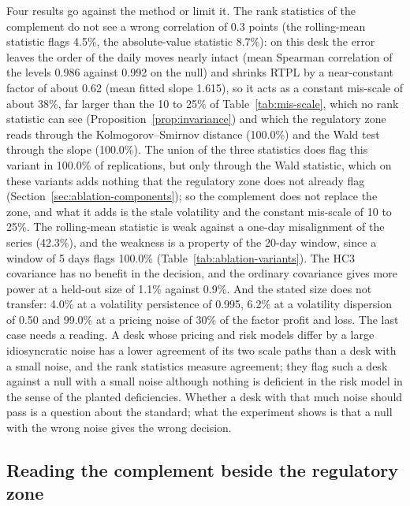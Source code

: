 Four results go against the method or limit it.
The rank statistics of the complement do not see a wrong correlation of 0.3 points (the rolling-mean statistic flags 4.5\%, the absolute-value statistic 8.7\%): on this desk the error leaves the order of the daily moves nearly intact (mean Spearman correlation of the levels 0.986 against 0.992 on the null) and shrinks RTPL by a near-constant factor of about 0.62 (mean fitted slope 1.615), so it acts as a constant mis-scale of about 38\%, far larger than the 10 to 25\% of Table~\ref{tab:mis-scale}, which no rank statistic can see (Proposition~\ref{prop:invariance}) and which the regulatory zone reads through the Kolmogorov--Smirnov distance (100.0\%) and the Wald test through the slope (100.0\%).
The union of the three statistics does flag this variant in 100.0\% of replications, but only through the Wald statistic, which on these variants adds nothing that the regulatory zone does not already flag (Section~\ref{sec:ablation-components}); so the complement does not replace the zone, and what it adds is the stale volatility and the constant mis-scale of 10 to 25\%.
The rolling-mean statistic is weak against a one-day misalignment of the series (42.3\%), and the weakness is a property of the 20-day window, since a window of 5 days flags 100.0\% (Table~\ref{tab:ablation-variants}).
The HC3 covariance has no benefit in the decision, and the ordinary covariance gives more power at a held-out size of 1.1\% against 0.9\%.
And the stated size does not transfer: 4.0\% at a volatility persistence of 0.995, 6.2\% at a volatility dispersion of 0.50 and 99.0\% at a pricing noise of 30\% of the factor profit and loss.
The last case needs a reading.
A desk whose pricing and risk models differ by a large idiosyncratic noise has a lower agreement of its two scale paths than a desk with a small noise, and the rank statistics measure agreement; they flag such a desk against a null with a small noise although nothing is deficient in the risk model in the sense of the planted deficiencies.
Whether a desk with that much noise should pass is a question about the standard; what the experiment shows is that a null with the wrong noise gives the wrong decision.

\subsection{Reading the complement beside the regulatory zone}
\label{sec:discussion-reading}

